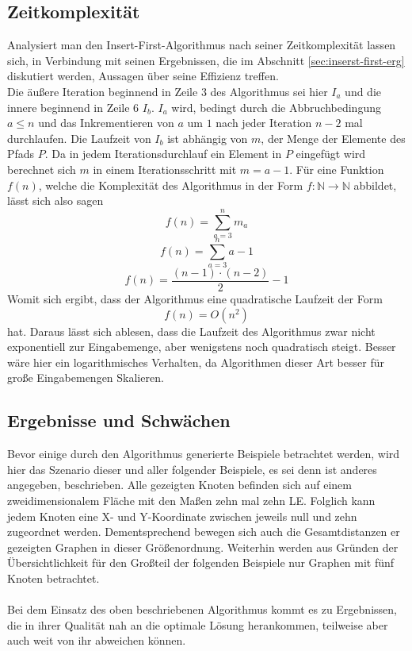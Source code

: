\subsection{Zeitkomplexität}\label{sec:time-comp-first}
Analysiert man den Insert-First-Algorithmus nach seiner Zeitkomplexität lassen sich, in Verbindung mit seinen Ergebnissen, die im Abschnitt \vref{sec:inserst-first-erg} diskutiert werden, Aussagen über seine Effizienz treffen.
\\
Die äußere Iteration beginnend in Zeile 3 des Algorithmus sei hier $I_a$ und die innere beginnend in Zeile 6 $I_b$.
$I_a$ wird, bedingt durch die Abbruchbedingung $a\leq n$ und das Inkrementieren von $a$ um $1$ nach jeder Iteration $n-2$ mal durchlaufen.
Die Laufzeit von $I_b$ ist abhängig von $m$, der Menge der Elemente des Pfads $P$.
Da in jedem Iterationsdurchlauf ein Element in $P$ eingefügt wird berechnet sich $m$ in einem Iterationsschritt mit $m=a-1$.
Für eine Funktion $f(n)$, welche die Komplexität des Algorithmus in der Form $f: \mathbb{N} \rightarrow \mathbb{N}$ abbildet, lässt sich also sagen
$$f(n) = \sum_{a = 3}^n m_a$$
$$f(n) = \sum_{a=3}^n a - 1$$
$$f(n) = \frac{(n-1)\cdot (n-2)}{2}-1$$
Womit sich ergibt, dass der Algorithmus eine quadratische Laufzeit der Form
$$f(n) = O(n^2)$$
hat.
Daraus lässt sich ablesen, dass die Laufzeit des Algorithmus zwar nicht exponentiell zur Eingabemenge, aber wenigstens noch quadratisch steigt.
Besser wäre hier ein logarithmisches Verhalten, da Algorithmen dieser Art besser für große Eingabemengen Skalieren.\autocite[S. 9ff.]{Gurski.2010}


\subsection{Ergebnisse und Schwächen} \label{sec:inserst-first-erg}
Bevor einige durch den Algorithmus generierte Beispiele betrachtet werden, wird hier das Szenario dieser und aller folgender Beispiele, es sei denn ist anderes angegeben, beschrieben.
Alle gezeigten Knoten befinden sich auf einem zweidimensionalem Fläche mit den Maßen zehn mal zehn \ac{LE}.
Folglich kann jedem Knoten eine X- und Y-Koordinate zwischen jeweils null und zehn zugeordnet werden. 
Dementsprechend bewegen sich auch die Gesamtdistanzen er gezeigten Graphen in dieser Größenordnung.
Weiterhin werden aus Gründen der Übersichtlichkeit für den Großteil der folgenden Beispiele nur Graphen mit fünf Knoten betrachtet.
\\\\
Bei dem Einsatz des oben beschriebenen Algorithmus kommt es zu Ergebnissen, die in ihrer Qualität nah an die optimale Lösung herankommen, teilweise aber auch weit von ihr abweichen können.  

